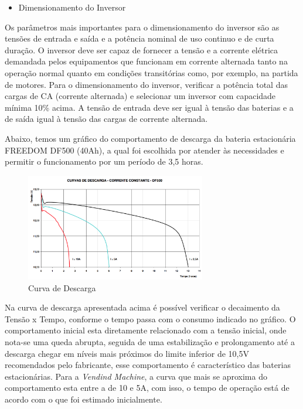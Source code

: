 \begin{itemize}
\item Dimensionamento do Inversor
\end{itemize}

        Os parâmetros mais importantes para o dimensionamento do inversor são as tensões de entrada e saída e a potência nominal de uso continuo e de curta duração. O inversor deve ser capaz de fornecer a tensão e a corrente elétrica demandada pelos equipamentos que funcionam em corrente alternada tanto na operação normal quanto em condições transitórias como, por exemplo, na partida de motores.
Para o dimensionamento do inversor, verificar a potência total das cargas de CA (corrente alternada) e selecionar um inversor com capacidade mínima 10\% acima. A tensão de entrada deve ser igual à tensão das baterias e a de saída igual à tensão das cargas de corrente alternada.

        Abaixo, temos um gráfico do comportamento de descarga da bateria estacionária FREEDOM DF500 (40Ah), a qual foi escolhida por atender às necessidades e permitir o funcionamento por um período de 3,5 horas.

      \begin{figure}[H]
    \centering
    \includegraphics[width=0.7\textwidth]{figuras/curva_descarga}
    \caption{Curva de Descarga}
    \label{fig:curva_descarga}
\end{figure}

		Na curva de descarga apresentada acima é possível verificar o decaimento da Tensão x Tempo, conforme o tempo passa com o consumo indicado no gráfico. O comportamento inicial esta diretamente relacionado com a tensão inicial, onde nota-se uma queda abrupta, seguida de uma estabilização e prolongamento até a descarga chegar em níveis mais próximos do limite inferior de 10,5V recomendados pelo fabricante, esse comportamento é característico das baterias estacionárias.
        Para a \textit{Vendind Machine}, a curva que mais se aproxima do comportamento esta entre a de 10 e 5A, com isso, o tempo de operação está de acordo com o que foi estimado inicialmente.

